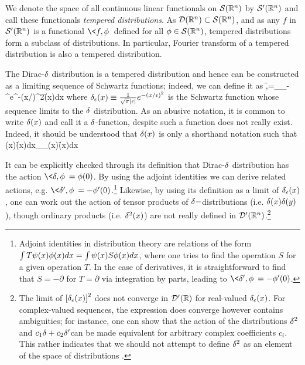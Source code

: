 We denote the space of all continuous linear functionals on $\mathcal{S}(\mathbb{R}^n)$ by $\mathcal{S}'(\mathbb{R}^n)$ and call these functionals \emph{tempered distributions}. As $\mathcal{D}(\mathbb{R}^n)\subset\mathcal{S}(\mathbb{R}^n)$, and as any $f$ in $\mathcal{S}'(\mathbb{R}^n)$ is a functional $\<f,\f\>$ defined for all $\phi\in\mathcal{S}(\mathbb{R}^n)$, tempered distributions form a subclass of distributions. In particular, Fourier transform of a tempered distribution is also a tempered distribution.

The Dirac-$\delta$ distribution is a tempered distribution and hence can be constructed as a limiting sequence of Schwartz functions; indeed, we can define it as
\be 
\<\de,\f\>=\lim\limits_{\e{}}\int\limits_{-\infty}^{\infty}e^{-(x/\e)^2}\f(x)dx
\ee 
where $\delta_\epsilon(x)\equiv\frac{1}{\sqrt{\pi}\abs{\epsilon}}e^{-(x/\epsilon)^2}$ is the Schwartz function whose sequence limits to the $\delta$ distribution. As an abusive notation, it is common to write $\delta(x)$ and call it a $\delta$-function, despite such a function does not really exist. Indeed, it should be understood that $\delta(x)$ is only a shorthand notation such that
\be 
\int\de(x)\f(x)dx\equiv\lim\limits_{\e{}}\int\de_\e(x)\f(x)dx
\ee 

It can be explicitly checked through its definition that Dirac-$\delta$ distribution has the action $\<\de,\f\>=\f(0)$. By using the adjoint identities we can derive related actions, e.g. $\<\de',\f\>=-\f'(0)$.\footnote{Adjoint identities in distribution theory are relations of the form $\int T\psi(x)\phi(x)dx=\int \psi(x)S\phi(x)dx$, where one tries to find the operation $S$ for a given operation $T$. In the case of derivatives, it is straightforward to find that $S=-\partial$ for $T=\partial$ via integration by parts, leading to $\<\de',\f\>=-\f'(0)$.} Likewise,
by using its definition as a limit of $\delta_\epsilon(x)$, one can work out the action of tensor products of $\delta-$distributions (i.e. $\delta(x)\delta(y)$), though ordinary products (i.e. $\delta^2(x)$) are not really defined in $\mathcal{D}'(\mathbb{R}^n)$.\footnote{\label{footnote: products of distributions}
	The limit of $\left[\delta_\epsilon(x)\right]^2$ does not converge in $\mathcal{D}'(\mathbb{R})$ for real-valued $\delta_\epsilon(x)$. For complex-valued sequences, the expression does converge however contains ambiguities; for instance, one can show that the action of the distributions $\delta^2$ and $c_1\delta+c_2\delta'$can be made equivalent for arbitrary complex coefficients $c_i$. This rather indicates that we should not attempt to define $\delta^2$ as an element of the space of distributions \cite{michael1992multiplication}.
}

